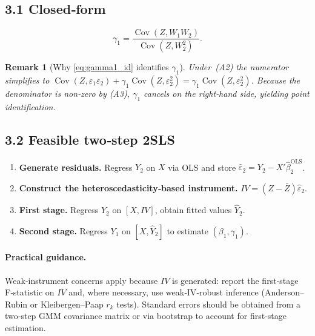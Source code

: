 \documentclass{article}
\newcommand{\cov}{\operatorname{Cov}}
\theoremstyle{plain}
\newtheorem{remark}{Remark}
\begin{document}
\subsection*{3.1 \; Closed‑form}

\begin{equation}\label{eq:gamma1_id}
\gamma_1
  = \frac{\cov(Z,W_1W_2)}{\cov(Z, W_2^2)}.
\end{equation}

\begin{remark}[Why \eqref{eq:gamma1_id} identifies $\gamma_1$]
Under~(A2) the numerator simplifies to
\(\cov(Z,\varepsilon_1\varepsilon_2)+\gamma_1\cov(Z,\varepsilon_2^2)
    =\gamma_1\cov(Z,\varepsilon_2^2)\).
Because the denominator is non‑zero by (A3),
\(\gamma_1\) cancels on the right‑hand side, yielding point identification.
\end{remark}

\subsection*{3.2 \; Feasible two‑step 2SLS}

\begin{enumerate}\itemsep2pt
\item \textbf{Generate residuals.}
      Regress \(Y_2\) on \(X\) via OLS and store
      $\hat\varepsilon_2 = Y_2 - X'\hat\beta_2^{\text{OLS}}$.

\item \textbf{Construct the heteroscedasticity‑based instrument.}
      \(IV = (Z-\bar Z)\hat\varepsilon_2\).

\item \textbf{First stage.} Regress \(Y_2\) on $[X,IV]$,
      obtain fitted values \(\hat Y_2\).

\item \textbf{Second stage.} Regress \(Y_1\) on $[X,\hat Y_2]$
      to estimate \((\beta_1,\gamma_1)\).
\end{enumerate}

\paragraph{Practical guidance.}
Weak‑instrument concerns apply because $IV$ is generated:
report the first‑stage F‑statistic on $IV$ and, where necessary,
use weak‑IV‑robust inference (Anderson–Rubin or Kleibergen–Paap
$r_k$ tests).  
Standard errors should be obtained from a two‑step GMM covariance
matrix or via bootstrap to account for first‑stage estimation.
\end{document}
